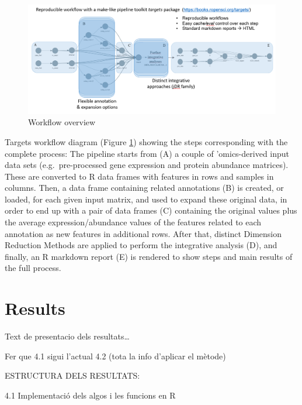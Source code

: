 \documentclass[a4paper, nobind]{templates/ociamthesis}
\renewcommand{\chaptermark}[1]{\markboth{\thechapter. #1}{\thechapter. #1}}
\begin{document}
\begin{figure}

{\centering \includegraphics[width=0.95\linewidth]{figures/chapter3/3-7_workflow_overview} 

}

\caption{Workflow overview}\label{fig:fig3-7}
\end{figure}

Targets workflow diagram (Figure \ref{fig:fig3-7}) showing the steps corresponding with the complete process: The pipeline starts from (A) a couple of 'omics-derived input data sets (e.g.~pre-processed gene expression and protein abundance matrices). These are converted to R data frames with features in rows and samples in columns. Then, a data frame containing related annotations (B) is created, or loaded, for each given input matrix, and used to expand these original data, in order to end up with a pair of data frames (C) containing the original values plus the average expression/abundance values of the features related to each annotation as new features in additional rows. After that, distinct Dimension Reduction Methods are applied to perform the integrative analysis (D), and finally, an R markdown report (E) is rendered to show steps and main results of the full process.

\hypertarget{results}{%
\chapter{Results}\label{results}}

\chaptermark{Results}

\minitoc 

Text de presentacio dels resultats\ldots{}

Fer que 4.1 sigui l'actual 4.2 (tota la info d'aplicar el mètode)

ESTRUCTURA DELS RESULTATS:

4.1 Implementació dels algos i les funcions en R
\end{document}
